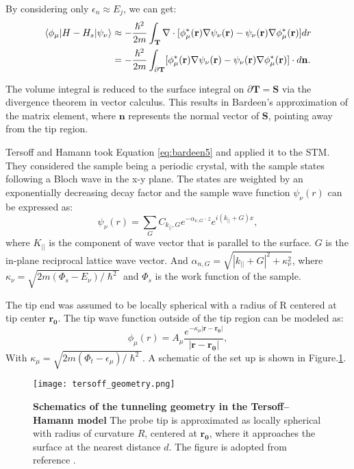 By considering only $\epsilon_n \approx E_j$, we can get:
\begin{align}
	\label{eq:bardeen4}
	\braket{\phi_{\mu}|H-H_s|\psi_{\nu}} &\approx -\frac{\hslash^2}{2m}\int_\mathbf{T}\nabla \cdot [\phi_{\mu}^*(\mathbf{r})\nabla\psi_{\nu}(\mathbf{r})-\psi_{\nu}(\mathbf{r})\nabla\phi_{\mu}^*(\mathbf{r})]dr\\ \label{eq:bardeen5}
	& = -\frac{\hslash^2}{2m}\int_{\partial\mathbf{T}}[\phi_{\mu}^*(\mathbf{r})\nabla\psi_{\nu}(\mathbf{r})-\psi_{\nu}(\mathbf{r})\nabla\phi_{\mu}^*(\mathbf{r})]\cdot d\mathbf{n}.
\end{align}

The volume integral is reduced to the surface integral on $\partial \mathbf{T} = \mathbf{S}$ via the divergence theorem in vector calculus. This results in Bardeen's approximation of the matrix element, where $\mathbf{n}$ represents the normal vector of $\mathbf{S}$, pointing away from the tip region.  

Tersoff and Hamann took Equation \ref{eq:bardeen5} and applied it to the \ac{STM}. They considered the sample being a periodic crystal, with the sample states following a Bloch wave in the x-y plane. The states are weighted by an exponentially decreasing decay factor and the sample wave function $\psi_{\nu}(r)$ can be expressed as:
\begin{equation}
	\label{eq:sample_wavefunction}
	\psi_{\nu}(r) = \sum_G C_{k_{||},G} e^{-\alpha_{\nu,G}\cdot z }e^{i(k_{||}+G)x},
\end{equation}
where $K_{||}$ is the component of wave vector that is parallel to the surface. $G$ is the in-plane reciprocal lattice wave vector. And $\alpha_{n,G} = \sqrt{|k_{||}+G|^2 + \kappa_{\nu}^2}$, where $\kappa_{\nu} = \sqrt{2m(\Phi_s - E_{\nu})/\hslash^2}$ and $\Phi_s$ is the work function of the sample. 

The tip end was assumed to be locally spherical with a radius of R centered at tip center $\mathbf{r_0}$. The tip wave function outside of the tip region can be modeled as:
\begin{equation}
	\label{eq:tip_wavefunction}
	\phi_{\mu}(r) = A_{\mu} \frac{e^{-\kappa_{\mu} |\mathbf{r-r_0}|}}{|\mathbf{r-r_0}|},
\end{equation}
With $\kappa_{\mu} = \sqrt{2m(\Phi_t-\epsilon_{\mu})/\hslash^2}$. A schematic of the set up is shown in Figure.\ref{fig:tersoff}. 
\begin{figure}
	\centering
	\texttt{[image: tersoff\_geometry.png]}
	\caption[\textbf{Schematics of the tunneling geometry in the Tersoff–Hamann model}]{\textbf{Schematics of the tunneling geometry in the Tersoff–Hamann model} The probe tip is approximated as locally spherical with radius of curvature $R$, centered at $\mathbf{r_0}$, where it approaches the surface at the nearest distance $d$. The figure is adopted from reference \cite{tersoffTheoryScanningTunneling1985}.}
	\label{fig:tersoff}
\end{figure}

